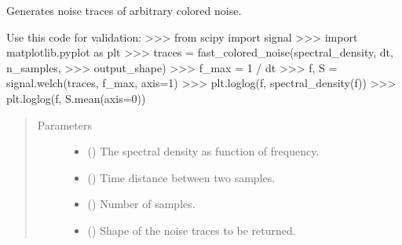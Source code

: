 \documentclass[letterpaper,10pt,english]{sphinxmanual}
\begin{document}

\begin{fulllineitems}
\label{\detokenize{qsim:qsim.noise.fast_colored_noise}}
Generates noise traces of arbitrary colored noise.

Use this code for validation:
\textgreater{}\textgreater{}\textgreater{} from scipy import signal
\textgreater{}\textgreater{}\textgreater{} import matplotlib.pyplot as plt
\textgreater{}\textgreater{}\textgreater{} traces = fast\_colored\_noise(spectral\_density, dt, n\_samples,
\textgreater{}\textgreater{}\textgreater{}                             output\_shape)
\textgreater{}\textgreater{}\textgreater{} f\_max = 1 / dt
\textgreater{}\textgreater{}\textgreater{} f, S = signal.welch(traces, f\_max, axis=\sphinxhyphen{}1)
\textgreater{}\textgreater{}\textgreater{} plt.loglog(f, spectral\_density(f))
\textgreater{}\textgreater{}\textgreater{} plt.loglog(f, S.mean(axis=0))
\begin{quote}\begin{description}
\item[{Parameters}] \leavevmode\begin{itemize}
\item {} 
 () \textendash{} The spectral density as function of frequency.

\item {} 
 () \textendash{} Time distance between two samples.

\item {} 
 () \textendash{} Number of samples.

\item {} 
 () \textendash{} Shape of the noise traces to be returned.


\end{itemize}
\end{description}
\end{quote}
\end{fulllineitems}
\end{document}
